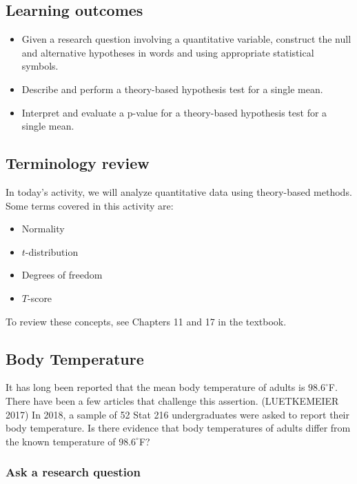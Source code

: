 \documentclass[
]{report}
\begin{document}

\subsection{Learning outcomes}\label{learning-outcomes-13}

\begin{itemize}
\item
  Given a research question involving a quantitative variable, construct the null and alternative hypotheses
  in words and using appropriate statistical symbols.
\item
  Describe and perform a theory-based hypothesis test for a single mean.
\item
  Interpret and evaluate a p-value for a theory-based hypothesis test for a single mean.
\end{itemize}

\subsection{Terminology review}\label{terminology-review-11}

In today's activity, we will analyze quantitative data using theory-based methods. Some terms covered in this activity are:

\begin{itemize}
\item
  Normality
\item
  \(t\)-distribution
\item
  Degrees of freedom
\item
  \(T\)-score
\end{itemize}

To review these concepts, see Chapters 11 and 17 in the textbook.

\subsection{Body Temperature}\label{body-temperature}

It has long been reported that the mean body temperature of adults is \(98.6^{\circ}\)F. There have been a few articles that challenge this assertion. (LUETKEMEIER 2017) In 2018, a sample of 52 Stat 216 undergraduates were asked to report their body temperature. Is there evidence that body temperatures of adults differ from the known temperature of \(98.6^{\circ}\)F?

\subsubsection*{Ask a research question}\label{ask-a-research-question-2}
\end{document}
